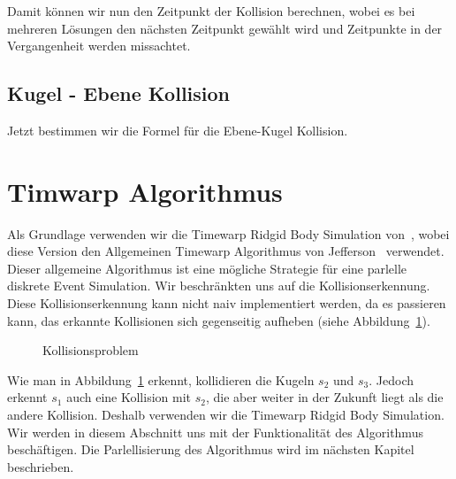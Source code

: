\documentclass[a4paper, 10pt, openright, parskip, chapterprefix]{scrreprt}
\begin{document}
\noindent Damit können wir nun den Zeitpunkt der Kollision berechnen, wobei es bei mehreren Lösungen den nächsten Zeitpunkt gewählt wird und Zeitpunkte in der Vergangenheit werden missachtet. 

\subsection{Kugel - Ebene Kollision}
Jetzt bestimmen wir die Formel für die Ebene-Kugel Kollision.
\section{Timwarp Algorithmus}
\label{sec:TimewarpAlgoritmus}
Als Grundlage verwenden wir die Timewarp Ridgid Body Simulation von~\cite{timewarp}, wobei diese Version  den Allgemeinen Timewarp Algorithmus von Jefferson~\cite{jefferson} verwendet. Dieser allgemeine Algorithmus ist eine mögliche Strategie für eine parlelle diskrete Event Simulation. Wir beschränkten uns auf die Kollisionserkennung. Diese Kollisionserkennung kann nicht naiv implementiert werden, da es passieren kann, das erkannte Kollisionen sich gegenseitig aufheben (siehe Abbildung~\ref{abb:kollision}).

\begin{figure}[t]
\centering{}
\caption{Kollisionsproblem}
\label{abb:kollision}
\end{figure}

Wie man in Abbildung~\ref{abb:kollision} erkennt, kollidieren die Kugeln $s_2$ und $s_3$. Jedoch erkennt $s_1$ auch eine Kollision mit $s_2$, die aber weiter in der Zukunft liegt als die andere Kollision. Deshalb verwenden wir die Timewarp Ridgid Body Simulation. Wir werden in diesem Abschnitt uns mit der Funktionalität des Algorithmus beschäftigen. Die Parlellisierung des Algorithmus wird im nächsten Kapitel beschrieben.
\end{document}
